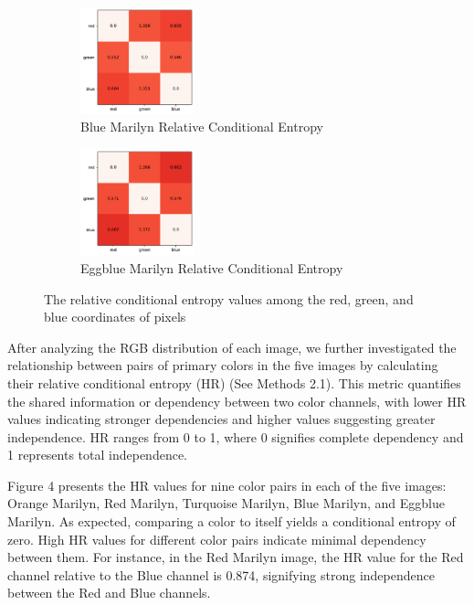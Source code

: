 \documentclass{article}
\begin{document}
\begin{figure}[ht]
  \begin{minipage}{0.6\textwidth}
    \centering
    \begin{subfigure}{0.45\textwidth}
      \centering
      \includegraphics[width=125px]{main_files/figure-latex/3_4_blue_marilyn_entropy.pdf}
      \caption{Blue Marilyn Relative Conditional Entropy}
      \label{fig:3_4_blue_marilyn_entropy}
    \end{subfigure}
    \hfill
    \begin{subfigure}{0.45\textwidth}
      \centering
      \includegraphics[width=125px]{main_files/figure-latex/3_5_eggblue_marilyn_entropy.pdf}
      \caption{Eggblue Marilyn Relative Conditional Entropy}
      \label{fig:3_5_eggblue_marilyn_entropy}
    \end{subfigure}
  \end{minipage}

  \caption{The relative conditional entropy values among the red, green, and blue coordinates of pixels}
  \label{fig:marilyn_entropy}
\end{figure}

\newpage

After analyzing the RGB distribution of each image, we further
investigated the relationship between pairs of primary colors in the
five images by calculating their relative conditional entropy (HR) (See
Methods 2.1). This metric quantifies the shared information or
dependency between two color channels, with lower HR values indicating
stronger dependencies and higher values suggesting greater independence.
HR ranges from 0 to 1, where 0 signifies complete dependency and 1
represents total independence.

Figure 4 presents the HR values for nine color pairs in each of the five
images: Orange Marilyn, Red Marilyn, Turquoise Marilyn, Blue Marilyn,
and Eggblue Marilyn. As expected, comparing a color to itself yields a
conditional entropy of zero. High HR values for different color pairs
indicate minimal dependency between them. For instance, in the Red
Marilyn image, the HR value for the Red channel relative to the Blue
channel is 0.874, signifying strong independence between the Red and
Blue channels.
\end{document}
